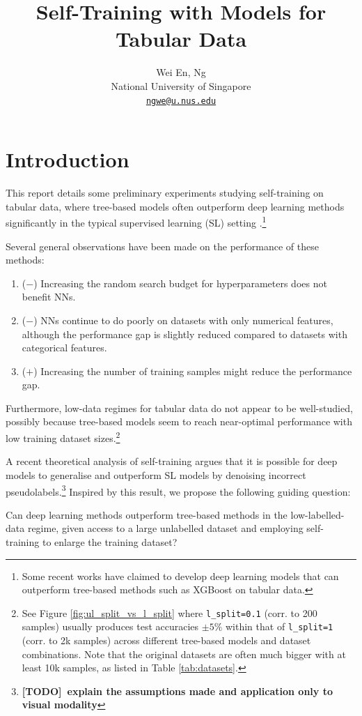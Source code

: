 \documentclass{article}
\title{Self-Training with Models for Tabular Data}
\author{
    Wei En, Ng \\
    National University of Singapore \\
    \texttt{\href{mailto:ngwe@u.nus.edu}{ngwe@u.nus.edu}}
}
\newcommand{\todo}{\bf \color{blue} [TODO]~}
\begin{document}
\maketitle

\section{Introduction}

This report details some preliminary experiments studying self-training
\cite{amini2023selftraining} on tabular data, where tree-based models often outperform
deep learning methods significantly in the typical supervised learning (SL) setting
\cite{shwartz-ziv2021tabular,grinsztajn2022why}.\footnote{%
  Some recent works \cite{gorishniy2023tabr} have claimed to develop deep learning
  models that can outperform tree-based methods such as XGBoost \cite{chen2016xgboost}
  on tabular data.
}

Several general observations have been made on the performance of these methods:
\begin{enumerate}
    \item ($\bm{-}$) Increasing the random search budget for hyperparameters does
    not benefit NNs. \cite{grinsztajn2022why}
    \item ($\bm{-}$) NNs continue to do poorly on datasets with only numerical
    features, although the performance gap is slightly reduced compared to datasets with
    categorical features. \cite{grinsztajn2022why}
    \item ($\bm{+}$) Increasing the number of training samples might reduce the
    performance gap. \cite{grinsztajn2022why}
\end{enumerate}

Furthermore, low-data regimes for tabular data do not appear to be well-studied,
possibly because tree-based models seem to reach near-optimal performance with low
training dataset sizes.\footnote{%
  See Figure \ref{fig:ul_split_vs_l_split} where \texttt{l\_split=0.1} (corr. to 200
  samples) usually produces test accuracies $\pm 5\%$ within that of \texttt{l\_split=1}
  (corr. to 2k samples) across different tree-based models and dataset combinations.
  Note that the original datasets are often much bigger with at least 10k samples, as
  listed in Table \ref{tab:datasets}.
}

A recent theoretical analysis of self-training \cite{wei2022theoretical} argues that it
is possible for deep models to generalise and outperform SL models by denoising
incorrect pseudolabels.\footnote{%
  \todo explain the assumptions made and application only to visual modality
} Inspired by this result, we propose the following guiding question:
\begin{displayquote}
  Can deep learning methods outperform tree-based methods in the low-labelled-data
  regime, given access to a large unlabelled dataset and employing self-training to
  enlarge the training dataset?
\end{displayquote}
\end{document}
